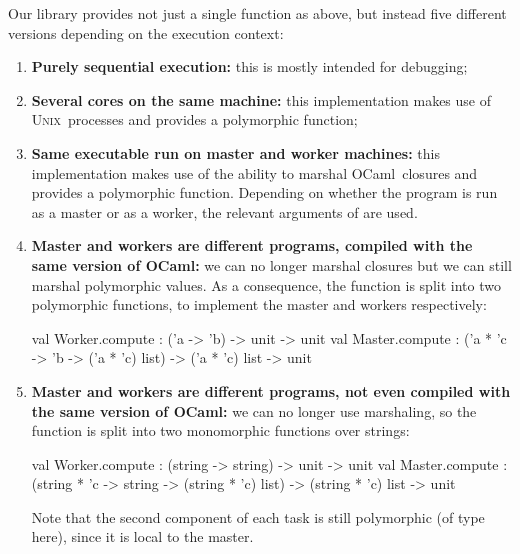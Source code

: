 \documentclass[preprint]{sigplanconf}
\newcommand{\Ocaml}{OCaml}
\newcommand{\unix}{\textsc{Unix}}
\begin{document}
Our library provides not just a single 
function as above, but instead five different versions
depending on the execution context:
\begin{enumerate}
\item \textbf{Purely sequential execution:}
  this is mostly intended for debugging;

\item \textbf{Several cores on the same machine:} 
  this implementation makes use of \unix\ processes and 
  provides a polymorphic  function;

\item \textbf{Same executable run on master and worker machines:}
  this implementation makes use of the ability to marshal \Ocaml\
  closures and  provides a polymorphic 
  function.
  Depending on whether the program is run as a master or as a worker,
  the relevant arguments of \ocaml{compute} are used.

\item \textbf{Master and workers are different programs, compiled with
    the same version of \Ocaml:} 
  we can no longer marshal closures but we can still
  marshal polymorphic values. As a consequence, 
  the  function is split into two
  polymorphic functions, to implement the master and workers 
  respectively:%
\vspace{-1em}
\begin{ocaml}
val Worker.compute : ('a -> 'b) -> unit -> unit
val Master.compute : 
  ('a * 'c -> 'b -> ('a * 'c) list) -> 
  ('a * 'c) list -> unit
\end{ocaml}
\item \textbf{Master and workers are different programs, not even
    compiled with the same version of \Ocaml:} we can no
  longer use marshaling, so the
   function is split into two monomorphic functions
  over strings:%
\vspace{-1em}
\begin{ocaml}
val Worker.compute : (string -> string) -> unit -> unit
val Master.compute : 
  (string * 'c -> string -> (string * 'c) list) -> 
  (string * 'c) list -> unit
\end{ocaml}
  Note that the second component of each task is still polymorphic (of
  type \ocaml{'c} here), since it is local to the master.
\end{enumerate}

\end{document}
